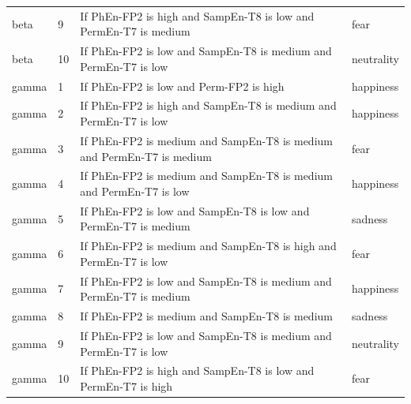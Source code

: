 \begin{longtable}{llp{7.2cm}l}
beta & 9 & If PhEn-FP2 is high and SampEn-T8 is low and PermEn-T7 is medium & fear \\
beta & 10 & If PhEn-FP2 is low and SampEn-T8 is medium and PermEn-T7 is low & neutrality \\
gamma & 1 & If PhEn-FP2 is low and Perm-FP2 is high & happiness \\
gamma & 2 & If PhEn-FP2 is high and SampEn-T8 is medium and PermEn-T7 is low & happiness \\
gamma & 3 & If PhEn-FP2 is medium and SampEn-T8 is medium and PermEn-T7 is medium & fear \\
gamma & 4 & If PhEn-FP2 is medium and SampEn-T8 is medium and PermEn-T7 is low & happiness \\
gamma & 5 & If PhEn-FP2 is low and SampEn-T8 is low and PermEn-T7 is medium & sadness \\
gamma & 6 & If PhEn-FP2 is medium and SampEn-T8 is high and PermEn-T7 is low & fear \\
gamma & 7 & If PhEn-FP2 is low and SampEn-T8 is medium and PermEn-T7 is medium & happiness \\
gamma & 8 & If PhEn-FP2 is medium and SampEn-T8 is medium & sadness \\
gamma & 9 & If PhEn-FP2 is low and SampEn-T8 is medium and PermEn-T7 is low & neutrality \\
gamma & 10 & If PhEn-FP2 is high and SampEn-T8 is low and PermEn-T7 is high & fear \\
\bottomrule
\end{longtable}
